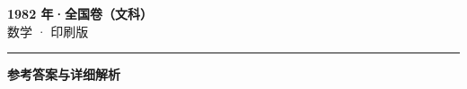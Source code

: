 \documentclass[zihao=5, a4paper]{ctexart}
\begin{document}
\begin{center}
  {\Large\bfseries 1982 年·全国卷（文科）}\\[4pt]
  {\large 数学 · 印刷版}
\end{center}
\medskip
{}

\par\bigskip\hrule\bigskip
{}
\begin{center}{\large\bfseries 参考答案与详细解析}\end{center}
\smallskip

\end{document}
